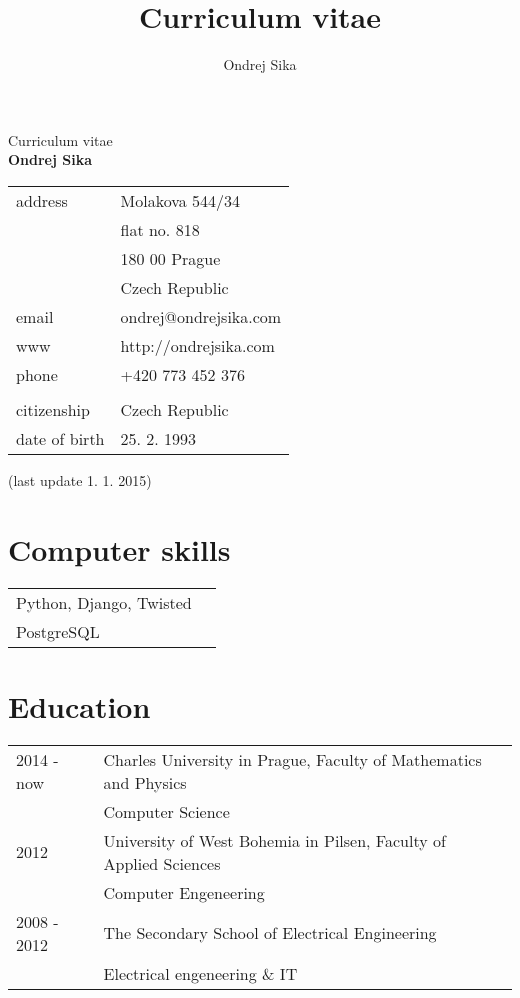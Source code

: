 \documentclass[12pt,a4paper]{article}
\title{Curriculum vitae}
\author{Ondrej Sika}
\begin{document}
\begin{center}
{\Large Curriculum vitae}\\
\vspace*{1cm}
{\LARGE \bf Ondrej Sika}\\
\vspace*{0.2cm}
\begin{tabular}{R{5cm}L{5cm}}
address & Molakova 544/34\\
 & flat no. 818\\
 & 180 00 Prague\\
 & Czech Republic\\
email & ondrej@ondrejsika.com\\
www & http://ondrejsika.com\\
phone & +420 773 452 376\\
\\
citizenship & Czech Republic\\
date of birth & 25. 2. 1993\\
\end{tabular}

\vspace*{0.2cm}
{\small (last update 1. 1. 2015)}
\end{center}

\section*{Computer skills}
\begin{tabular}{@{}ll}
Python, Django, Twisted & \\
PostgreSQL & \\
\end{tabular}

\section*{Education}
\begin{tabular}{@{}p{2cm}l}
2014 - now & Charles University in Prague, Faculty of Mathematics and Physics\\
 & Computer Science\\
2012  & University of West Bohemia in Pilsen, Faculty of Applied Sciences\\
 & Computer Engeneering\\
2008 - 2012 & The Secondary School of Electrical Engineering\\
 & Electrical engeneering \& IT\\
\end{tabular}
\end{document}
